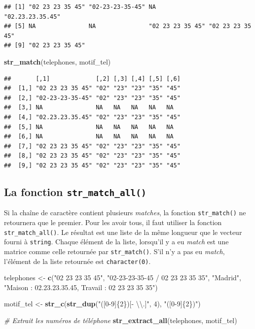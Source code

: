 \documentclass[
  11pt,
]{book}
\newenvironment{Shaded}{\begin{snugshade}}{\end{snugshade}}
\newcommand{\CharTok}[1]{\textcolor[rgb]{0.31,0.60,0.02}{#1}}
\newcommand{\CommentTok}[1]{\textcolor[rgb]{0.56,0.35,0.01}{\textit{#1}}}
\newcommand{\DecValTok}[1]{\textcolor[rgb]{0.00,0.00,0.81}{#1}}
\newcommand{\KeywordTok}[1]{\textcolor[rgb]{0.13,0.29,0.53}{\textbf{#1}}}
\newcommand{\NormalTok}[1]{#1}
\newcommand{\StringTok}[1]{\textcolor[rgb]{0.31,0.60,0.02}{#1}}
\numberwithin{equation}{section}
\numberwithin{countremarque}{section}
\begin{document}
\begin{lstlisting}
## [1] "02 23 23 35 45" "02-23-23-35-45" NA               "02.23.23.35.45"
## [5] NA               NA               "02 23 23 35 45" "02 23 23 35 45"
## [9] "02 23 23 35 45"
\end{lstlisting}

\begin{Shaded}
\begin{Highlighting}[]
\KeywordTok{str\_match}\NormalTok{(telephones, motif\_tel)}
\end{Highlighting}
\end{Shaded}

\begin{lstlisting}
##       [,1]             [,2] [,3] [,4] [,5] [,6]
##  [1,] "02 23 23 35 45" "02" "23" "23" "35" "45"
##  [2,] "02-23-23-35-45" "02" "23" "23" "35" "45"
##  [3,] NA               NA   NA   NA   NA   NA  
##  [4,] "02.23.23.35.45" "02" "23" "23" "35" "45"
##  [5,] NA               NA   NA   NA   NA   NA  
##  [6,] NA               NA   NA   NA   NA   NA  
##  [7,] "02 23 23 35 45" "02" "23" "23" "35" "45"
##  [8,] "02 23 23 35 45" "02" "23" "23" "35" "45"
##  [9,] "02 23 23 35 45" "02" "23" "23" "35" "45"
\end{lstlisting}

\hypertarget{manip_regex_stringr_match_all}{%
\subsection{\texorpdfstring{La fonction \texttt{str\_match\_all()}}{La fonction str\_match\_all()}}\label{manip_regex_stringr_match_all}}

Si la chaîne de caractère contient plusieurs \emph{matches}, la fonction \texttt{str\_match()} ne retournera que le premier. Pour les avoir tous, il faut utiliser la fonction \texttt{str\_match\_all()}. Le résultat est une liste de la même longueur que le vecteur fourni à \texttt{string}. Chaque élément de la liste, lorsqu'il y a eu \emph{match} est une matrice comme celle retournée par \texttt{str\_match()}. S'il n'y a pas eu \emph{match}, l'élément de la liste retournée est \texttt{character(0)}.

\begin{Shaded}
\begin{Highlighting}[]
\NormalTok{telephones \textless{}{-}}\StringTok{ }\KeywordTok{c}\NormalTok{(}\StringTok{"02 23 23 35 45"}\NormalTok{, }\StringTok{"02{-}23{-}23{-}35{-}45 / 02 23 23 35 35"}\NormalTok{,}
                \StringTok{"Madrid"}\NormalTok{, }\StringTok{"Maison : 02.23.23.35.45, Travail : 02 23 23 35 35"}\NormalTok{)}


\NormalTok{motif\_tel \textless{}{-}}\StringTok{ }\KeywordTok{str\_c}\NormalTok{(}\KeywordTok{str\_dup}\NormalTok{(}\StringTok{"([0{-}9]\{2\})[{-} }\CharTok{\textbackslash{}\textbackslash{}}\StringTok{.]"}\NormalTok{, }\DecValTok{4}\NormalTok{),  }\StringTok{"([0{-}9]\{2\})"}\NormalTok{)}

\CommentTok{\# Extrait les numéros de téléphone}
\KeywordTok{str\_extract\_all}\NormalTok{(telephones, motif\_tel)}
\end{Highlighting}
\end{Shaded}
\end{document}

